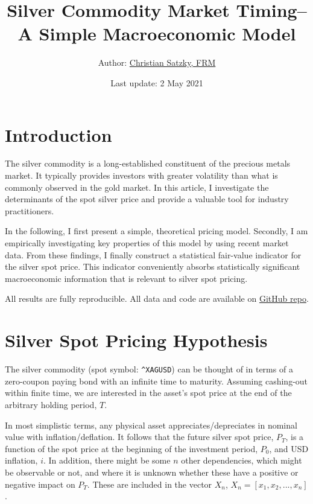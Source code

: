 \documentclass[
  12pt,
]{article}
\title{Silver Commodity Market Timing--\\
A Simple Macroeconomic Model}
\author{Author: \href{https://www.linkedin.com/in/christian-satzky/}{Christian
Satzky, FRM}}
\date{Last update: 2 May 2021}
\begin{document}
\maketitle

\newpage
\hypersetup{linkcolor=black}
\tableofcontents
\newpage
\hypersetup{linkcolor=blue}

\hypertarget{introduction}{%
\section{Introduction}\label{introduction}}

The silver commodity is a long-established constituent of the precious
metals market. It typically provides investors with greater volatility
than what is commonly observed in the gold market. In this article, I
investigate the determinants of the spot silver price and provide a
valuable tool for industry practitioners.

In the following, I first present a simple, theoretical pricing model.
Secondly, I am empirically investigating key properties of this model by
using recent market data. From these findings, I finally construct a
statistical fair-value indicator for the silver spot price. This
indicator conveniently absorbs statistically significant macroeconomic
information that is relevant to silver spot pricing.

All results are fully reproducible. All data and code are available on
\href{https://github.com/sharelab/silver-market-timing}{GitHub repo}.

\hypertarget{silver-spot-pricing-hypothesis}{%
\section{Silver Spot Pricing
Hypothesis}\label{silver-spot-pricing-hypothesis}}

The silver commodity (spot symbol: \texttt{\^{}XAGUSD}) can be thought
of in terms of a zero-coupon paying bond with an infinite time to
maturity. Assuming cashing-out within finite time, we are interested in
the asset's spot price at the end of the arbitrary holding period,
\(T\).

In most simplistic terms, any physical asset appreciates/depreciates in
nominal value with inflation/deflation. It follows that the future
silver spot price, \(P_T\), is a function of the spot price at the
beginning of the investment period, \(P_0\), and USD inflation, \(i\).
In addition, there might be some \(n\) other dependencies, which might
be observable or not, and where it is unknown whether these have a
positive or negative impact on \(P_T\). These are included in the vector
\(X_n\), \(X_n = [x_1, x_2,..., x_n]\).
\end{document}
